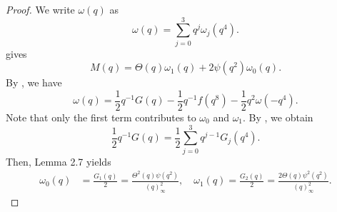 \documentclass[12pt,reqno]{amsart}
\renewcommand{\o}{{\omega}}
\renewcommand{\(}{\left\(}
\renewcommand{\)}{\right\)}
\numberwithin{equation}{section}
\theoremstyle{plain}
\theoremstyle{definition}
\numberwithin{equation}{section}
\renewcommand{\pmod}[1]{\ \left( \mathrm{mod} \, #1 \right)}
\begin{document}
\begin{proof}
 

We write $\o(q)$ as 
	\[
	\o(q)=\sum_{j=0}^{3}q^j\o_{j}\!\left(q^4\right). 
	\]
 gives 
\begin{equation}\label{ref2}
M(q)=\Theta(q)\o_1(q)+2\psi\!\left(q^2\right)\o_0(q).
\end{equation}
 By , we have
\[
\o(q)=\frac 12q^{-1}G(q)-\frac 12q^{-1}f\!\left(q^8\right)-\frac 12 q^2\o\!\left(-q^4\right).
\]
Note that only the first term contributes to $\o_0$ and $\o_1$. By , we obtain
\[
\frac 12q^{-1}G(q)=\frac 12\sum_{j=0}^3q^{j-1}G_j\!\left(q^4\right).
\]
Then, Lemma 2.7 yields
\begin{align}\label{eqn2}
\o_0(q)&=\frac{G_1(q)}2=\frac{\Theta^2(q)\psi\!\left(q^2\right)}{(q)^2_{\infty}},\quad  \o_1(q)=\frac{G_2(q)}2=\frac{2\Theta(q)\psi^2\!\left(q^2\right)}{(q)^2_{\infty}}.
\end{align}


\end{proof}
\end{document}
